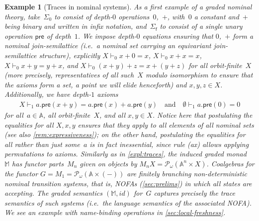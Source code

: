 \documentclass[11pt,a4paper]{amsart}
\newtheorem{example}[example]{Example}
\newcommand{\pre}{\mathsf{pre}}
\newcommand{\sigp}{\Sigma_0}
\newcommand{\sigf}{\Sigma_{\mathsf f}}
\newcommand{\Names}{\mathbb{A}}
\newcommand{\pow}{\mathcal{P}}
\newcommand{\powf}{\pow_{\omega}}
\theoremstyle{plain}
\newcommand{\id}{\mathit{id}}
\numberwithin{equation}{section}
\newcommand{\monad}{{\mathbb{M}}}
\newcommand{\+}[1]{\mathcal{#1}\xspace}
\theoremstyle{definition}
\begin{document}
\begin{example}[Traces in nominal systems]\label{expl:nominal-ts}
  As a first example of a graded nominal theory, take~$\sigp$ to
  consist of depth-$0$ operations~$0$,~$+$, with~$0$ a constant
  and~$+$ being binary and written in infix notation, and~$\sigf$ to
  consist of a single unary operation $\pre$ of depth~$1$. We impose
  depth-$0$ equations ensuring that $0$,~$+$ form a \emph{nominal join-semilattice} (i.e.~a nominal set carrying an equivariant
  join-semilattice structure), explicitly $X\vdash_0 x+0=x$,
  $X\vdash_0 x+x=x$, $X\vdash_0 x+y=y+x$, and
  $X\vdash_0 (x+y)+z=x+(y+z)$ for all orbit-finite~$X$ (more
  precisely, representatives of all such~$X$ modulo isomorphism to
  ensure that the axioms form a set, a point we will elide henceforth)
  and $x,y,z\in X$. Additionally, we have depth-$1$ axioms
  \begin{gather}
    X\vdash_1a.\pre(x+y)=a.\pre(x)+a.\pre(y)
    \quad\text{and}\quad
    \emptyset\vdash_1 a.\pre(0)=0\label{ax:distributivity-pre}
  \end{gather}
  for all~$a\in\Names$, all orbit-finite~$X$, and all $x,y\in X$.
  Notice here that postulating the equalities for \emph{all} $X,x,y$
  ensures that they apply to all elements of all nominal sets (see
  also \cref{rem:expressiveness}); on the other hand, postulating the
  equalities for all rather than just some~$a$ is in fact inessential,
  since rule (ax) allows applying permutations to axioms. Similarly as
  in \cref{expl:traces}, the induced graded monad~$\monad$ has functor
  parts~$M_n$ given on objects by $M_nX=\powf(\Names^n\times
  X)$. Coalgebras for the functor $G=M_1=\powf(\Names\times(-))$ are
  finitely branching \emph{non-deterministic nominal transition
    systems}, that is, NOFAs (\cref{sec:prelims}) in which all states
  are accepting. The graded semantics $(\monad,\id)$ for~$G$ captures
  precisely the trace semantics of such systems (i.e.\ the language
  semantics of the associated NOFA). We see an example with
  name-binding operations in \cref{sec:local-freshness}.
\end{example}
\end{document}
